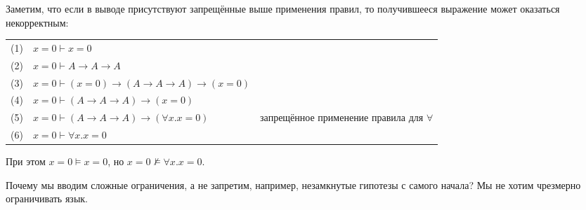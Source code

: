 \documentclass[10pt,a4paper,oneside]{article}
\begin{document}
\begin{enumerate}
Заметим, что если в выводе присутствуют запрещённые выше применения правил, то получившееся выражение может оказаться некорректным:

\begin{tabular}{lll}
(1) & $x = 0\vdash x = 0$\\
(2) & $x = 0\vdash A \rightarrow A \rightarrow A$ \\
(3) & $x = 0\vdash (x = 0) \rightarrow (A \rightarrow A \rightarrow A) \rightarrow (x=0)$ \\
(4) & $x = 0\vdash (A \rightarrow A \rightarrow A) \rightarrow (x=0)$\\
(5) & $x = 0\vdash (A \rightarrow A \rightarrow A) \rightarrow (\forall x.x=0)$ & запрещённое применение правила для $\forall$\\
(6) & $x = 0\vdash \forall x.x=0$
\end{tabular}

При этом $x = 0 \models x = 0$, но $x = 0\not\models \forall x.x = 0$.

Почему мы вводим сложные ограничения, а не запретим, например, незамкнутые гипотезы с самого начала? Мы
не хотим чрезмерно ограничивать язык.

\end{enumerate}
\end{document}
